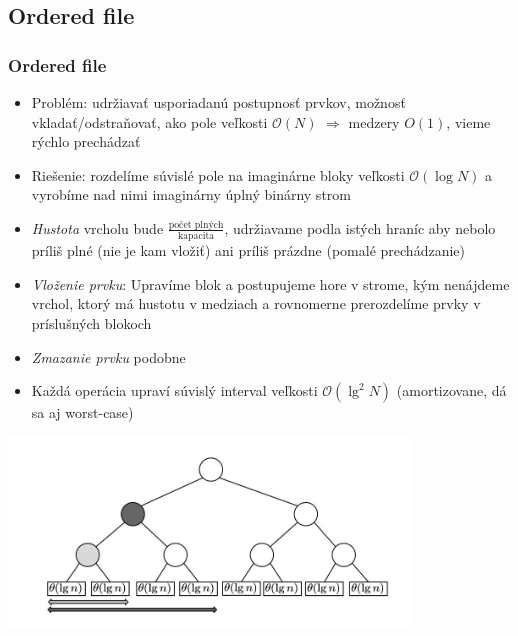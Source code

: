 \documentclass{beamer}
\newcommand{\bigO}{\ensuremath{\mathcal{O}}}
\begin{document}
\subsection{Ordered file}
\begin{frame}
    \frametitle{Ordered file}
    \begin{itemize}
        \item Problém: udržiavať usporiadanú postupnosť prvkov, možnosť vkladať/odstraňovať, ako pole veľkosti $\bigO(N)$ $\Rightarrow$ medzery $O(1)$, vieme rýchlo prechádzať
        \item Riešenie: rozdelíme súvislé pole na imaginárne bloky veľkosti $\bigO(\log N)$ a vyrobíme nad nimi imaginárny úplný binárny strom
        \item {\em Hustota} vrcholu bude $\frac{\text{počet plných}}{\text{kapacita}}$, udržiavame podla istých hraníc aby nebolo príliš plné (nie je kam vložiť) ani príliš prázdne (pomalé prechádzanie)
        \item {\em Vloženie prvku}: Upravíme blok a postupujeme hore v strome, kým nenájdeme vrchol, ktorý má hustotu v medziach a rovnomerne prerozdelíme prvky v príslušných blokoch
        \item {\em Zmazanie prvku} podobne
        \item Každá operácia upraví súvislý interval veľkosti $\bigO(\lg^2 N)$ (amortizovane, dá sa aj worst-case)
    \end{itemize}
\end{frame}

\begin{frame}
\begin{center}
        \includegraphics[width=0.8\textwidth,]{../figures/downloaded_dont_use/fig2-ofm.jpg}
    \end{center}
\end{frame}
\end{document}
